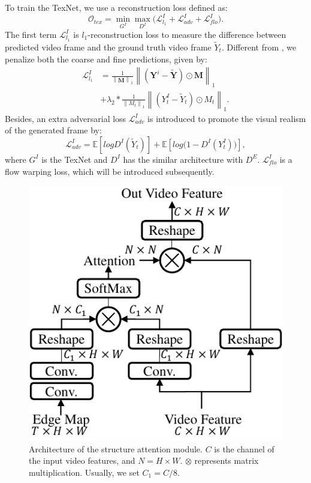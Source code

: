 To train the TexNet, we use a reconstruction loss defined as:
%
\begin{equation}
	\label{eq:1}
		\mathcal{O}_{tex}=\min\limits_{G^I} \max \limits_{D^I} \big(\mathcal{L}^{I}_{l_1}+\mathcal{L}^I_{adv}+\mathcal{L}^{I}_{flo}\big).
\end{equation}
%
The first term $\mathcal{L}^{I}_{l_1}$ is $l_1$-reconstruction loss to measure the difference between predicted video frame and the ground truth video frame $\widetilde{Y}_t$.
Different from \cite{nazeri2019edgeconnect}, we penalize both the coarse and fine predictions, given by:
\begin{equation}
	\begin{aligned}
		\mathcal{L}^{I}_{l_1}&=\frac{1}{\left\|\boldsymbol{M} \right\|_1}\left\|(\boldsymbol{Y}^i-\widetilde{\boldsymbol{Y}})\odot \boldsymbol{M}\right\|_1\\ &+\lambda_2*\frac{1}{\left\|M_t \right\|_1}\left\|(Y^I_t-\widetilde{Y}_t)\odot M_t\right\|_1.
	\end{aligned}
\end{equation}
%
%
Besides, an extra adversarial loss $\mathcal{L}^I_{adv}$ is introduced to promote the visual realism of the generated frame by:
\begin{equation}
	\label{eq:inp_adver}
	\mathcal{L}^I_{adv}=\mathbb{E}[logD^I(\widetilde{Y}_t)]+\mathbb{E}[log\big(1-D^I(Y^I_{t})\big)],
\end{equation}
where $G^I$ is the TexNet and $D^I$ has the similar architecture with $D^E$.
$\mathcal{L}^I_{flo}$ is a flow warping loss, which will be introduced subsequently.




 \begin{figure}[t]
	\centering
	\includegraphics[width=0.7\columnwidth]{SEM} %
	\caption{Architecture of the structure attention module. $C$ is the channel of the input video features, and $N=H\times W$. $\otimes$ represents matrix multiplication. Usually, we set $C_1=C/8$.}
	\label{SEM}
\end{figure} 



